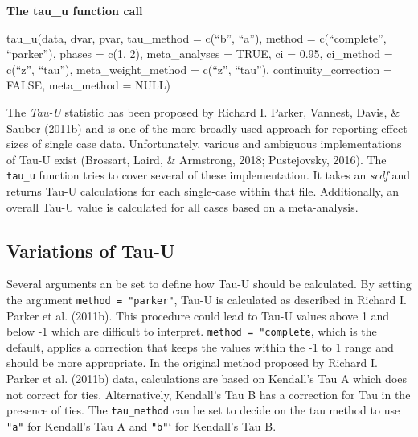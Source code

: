 \documentclass[
  letterpaper,
  DIV=11,
  numbers=noendperiod]{scrreprt}
\begin{document}
\begin{tcolorbox}[enhanced jigsaw, breakable, rightrule=.15mm, bottomrule=.15mm, arc=.35mm, colback=white, colframe=quarto-callout-tip-color-frame, opacityback=0, leftrule=.75mm, toprule=.15mm, left=2mm]
\begin{minipage}[t]{5.5mm}
\textcolor{quarto-callout-tip-color}{\faLightbulb}
\end{minipage}%
\begin{minipage}[t]{\textwidth - 5.5mm}

\textbf{The tau\_u function call}\vspace{2mm}

tau\_u(data, dvar, pvar, tau\_method = c(``b'', ``a''), method =
c(``complete'', ``parker''), phases = c(1, 2), meta\_analyses = TRUE, ci
= 0.95, ci\_method = c(``z'', ``tau''), meta\_weight\_method = c(``z'',
``tau''), continuity\_correction = FALSE, meta\_method = NULL)

\end{minipage}%
\end{tcolorbox}

The \emph{Tau-U} statistic has been proposed by Richard I. Parker,
Vannest, Davis, \& Sauber (2011b) and is one of the more broadly used
approach for reporting effect sizes of single case data. Unfortunately,
various and ambiguous implementations of Tau-U exist (Brossart, Laird,
\& Armstrong, 2018; Pustejovsky, 2016). The \texttt{tau\_u} function
tries to cover several of these implementation. It takes an \emph{scdf}
and returns Tau-U calculations for each single-case within that file.
Additionally, an overall Tau-U value is calculated for all cases based
on a meta-analysis.

\hypertarget{variations-of-tau-u}{%
\subsection{Variations of Tau-U}\label{variations-of-tau-u}}

Several arguments an be set to define how Tau-U should be calculated. By
setting the argument \texttt{method\ =\ "parker"}, Tau-U is calculated
as described in Richard I. Parker et al. (2011b). This procedure could
lead to Tau-U values above 1 and below -1 which are difficult to
interpret. \texttt{method\ =\ "complete}, which is the default, applies
a correction that keeps the values within the -1 to 1 range and should
be more appropriate. In the original method proposed by Richard I.
Parker et al. (2011b) data, calculations are based on Kendall's Tau A
which does not correct for ties. Alternatively, Kendall's Tau B has a
correction for Tau in the presence of ties. The \texttt{tau\_method} can
be set to decide on the tau method to use \texttt{"a"} for Kendall's Tau
A and \texttt{"b"}` for Kendall's Tau B.
\end{document}
